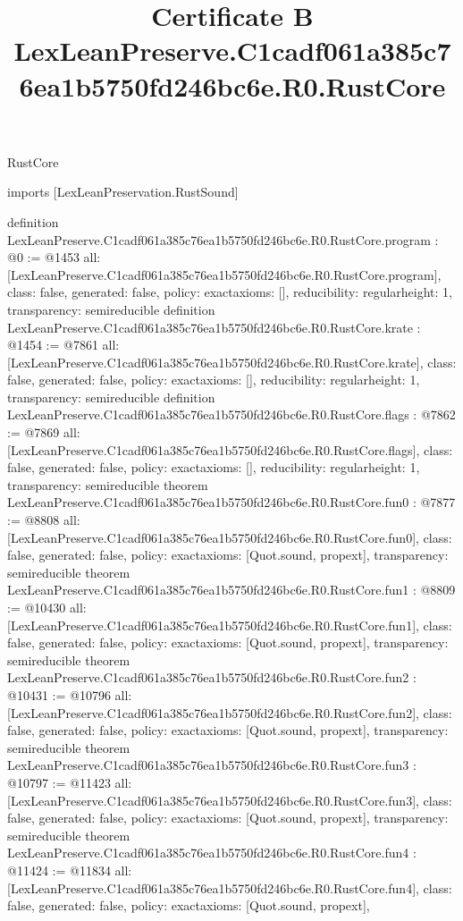 \begin{lexlean}{RustCore}
\title{Certificate B LexLeanPreserve.C1cadf061a385c76ea1b5750fd246bc6e.R0.RustCore}
\begin{coremodule}
imports [LexLeanPreservation.RustSound]

definition LexLeanPreserve.C1cadf061a385c76ea1b5750fd246bc6e.R0.RustCore.program : @0 := @1453 {
  all: [LexLeanPreserve.C1cadf061a385c76ea1b5750fd246bc6e.R0.RustCore.program],
  class: false,
  generated: false,
  policy: exact{axioms: []},
  reducibility: regular{height: 1},
  transparency: semireducible
}
definition LexLeanPreserve.C1cadf061a385c76ea1b5750fd246bc6e.R0.RustCore.krate : @1454 := @7861 {
  all: [LexLeanPreserve.C1cadf061a385c76ea1b5750fd246bc6e.R0.RustCore.krate],
  class: false,
  generated: false,
  policy: exact{axioms: []},
  reducibility: regular{height: 1},
  transparency: semireducible
}
definition LexLeanPreserve.C1cadf061a385c76ea1b5750fd246bc6e.R0.RustCore.flags : @7862 := @7869 {
  all: [LexLeanPreserve.C1cadf061a385c76ea1b5750fd246bc6e.R0.RustCore.flags],
  class: false,
  generated: false,
  policy: exact{axioms: []},
  reducibility: regular{height: 1},
  transparency: semireducible
}
theorem LexLeanPreserve.C1cadf061a385c76ea1b5750fd246bc6e.R0.RustCore.fun0 : @7877 := @8808 {
  all: [LexLeanPreserve.C1cadf061a385c76ea1b5750fd246bc6e.R0.RustCore.fun0],
  class: false,
  generated: false,
  policy: exact{axioms: [Quot.sound, propext]},
  transparency: semireducible
}
theorem LexLeanPreserve.C1cadf061a385c76ea1b5750fd246bc6e.R0.RustCore.fun1 : @8809 := @10430 {
  all: [LexLeanPreserve.C1cadf061a385c76ea1b5750fd246bc6e.R0.RustCore.fun1],
  class: false,
  generated: false,
  policy: exact{axioms: [Quot.sound, propext]},
  transparency: semireducible
}
theorem LexLeanPreserve.C1cadf061a385c76ea1b5750fd246bc6e.R0.RustCore.fun2 : @10431 := @10796 {
  all: [LexLeanPreserve.C1cadf061a385c76ea1b5750fd246bc6e.R0.RustCore.fun2],
  class: false,
  generated: false,
  policy: exact{axioms: [Quot.sound, propext]},
  transparency: semireducible
}
theorem LexLeanPreserve.C1cadf061a385c76ea1b5750fd246bc6e.R0.RustCore.fun3 : @10797 := @11423 {
  all: [LexLeanPreserve.C1cadf061a385c76ea1b5750fd246bc6e.R0.RustCore.fun3],
  class: false,
  generated: false,
  policy: exact{axioms: [Quot.sound, propext]},
  transparency: semireducible
}
theorem LexLeanPreserve.C1cadf061a385c76ea1b5750fd246bc6e.R0.RustCore.fun4 : @11424 := @11834 {
  all: [LexLeanPreserve.C1cadf061a385c76ea1b5750fd246bc6e.R0.RustCore.fun4],
  class: false,
  generated: false,
  policy: exact{axioms: [Quot.sound, propext]},
}
\end{coremodule}
\end{lexlean}
